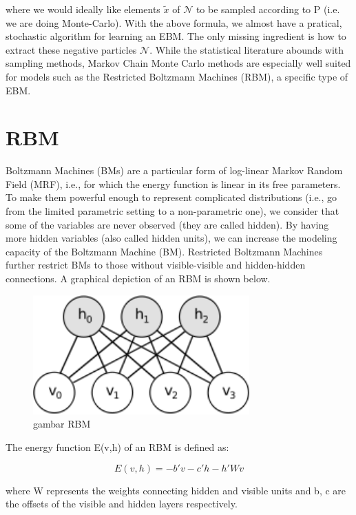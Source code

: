 \documentclass[12pt]{article}
\begin{document}
where we would ideally like elements $\tilde{x}$ of $\mathcal{N}$ to be sampled according to P (i.e. we are doing Monte-Carlo). With the above formula, we almost have a pratical, stochastic algorithm for learning an EBM. The only missing ingredient is how to extract these negative particles $\mathcal{N}$. While the statistical literature abounds with sampling methods, Markov Chain Monte Carlo methods are especially well suited for models such as the Restricted Boltzmann Machines (RBM), a specific type of EBM.

\section{RBM}

Boltzmann Machines (BMs) are a particular form of log-linear Markov Random Field (MRF), i.e., for which the energy function is linear in its free parameters. To make them powerful enough to represent complicated distributions (i.e., go from the limited parametric setting to a non-parametric one), we consider that some of the variables are never observed (they are called hidden). By having more hidden variables (also called hidden units), we can increase the modeling capacity of the Boltzmann Machine (BM). Restricted Boltzmann Machines further restrict BMs to those without visible-visible and hidden-hidden connections. A graphical depiction of an RBM is shown below.


\begin{figure}
	\centering
	\includegraphics[width=0.74\textwidth]
		{pics/rbm.png}
	\caption{gambar RBM}
	\label{fig:lisensi}
\end{figure}


The energy function E(v,h) of an RBM is defined as:

\begin{equation}
E(v,h) = - b'v - c'h - h'Wv
\end{equation}

where W represents the weights connecting hidden and visible units and b, c are the offsets of the visible and hidden layers respectively.
\end{document}
